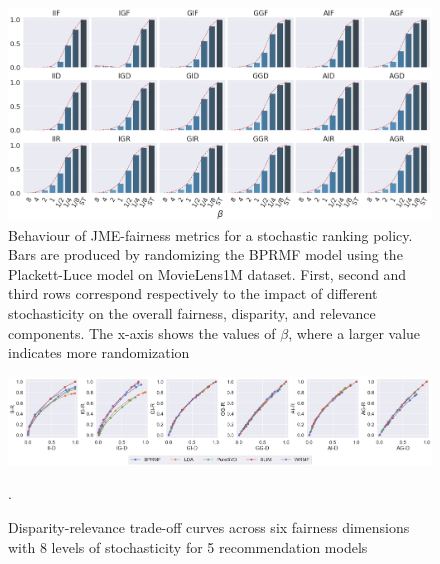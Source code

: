 \begin{figure}[ht]
    \centering
    \includegraphics[width=\columnwidth]{Figures/Figure_2.png}
    \caption{Behaviour of JME-fairness metrics for a stochastic ranking policy. Bars are produced by randomizing the BPRMF model using the Plackett-Luce model on MovieLens1M dataset. First, second and third rows correspond respectively to the impact of different stochasticity on the overall fairness, disparity, and relevance components. The x-axis shows the values of $\beta$, where a larger value indicates more randomization}
    \label{fig2}
\end{figure}
\begin{figure}[ht]
    \centering
    \includegraphics[width=\columnwidth]{Figures/Figure_3_Age.png}
    \caption{Disparity-relevance trade-off curves across six fairness dimensions with 8 levels of stochasticity for 5  recommendation models}.
    \label{dr_tradeoff}
\vspace{-4mm}
\end{figure}
